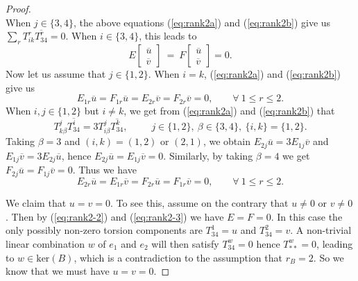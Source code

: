 \documentclass[10pt,a4paper]{amsart}
\begin{document}
\begin{proof}
\begin{equation}
\end{equation}
When $j\in \{ 3,4\}$, the above equations (\ref{eq:rank2a}) and (\ref{eq:rank2b}) give us $\sum_r T^r_{ik} \overline{T^r_{34}} =0$. When $i\in \{ 3,4\}$, this leads to
\begin{equation}  \label{eq:rank2-1}
 E \left[ \begin{array}{c} \overline{u} \\ \overline{v} \end{array} \right] \ = \  F \left[ \begin{array}{c} \overline{u} \\ \overline{v} \end{array} \right]  = 0.
\end{equation}
Now let us assume that $j\in \{ 1,2\}$. When $i=k$, (\ref{eq:rank2a}) and (\ref{eq:rank2b}) give us
\begin{equation}  \label{eq:rank2-2}
 E_{1r} \overline{u} = F_{1r} \overline{u} = E_{2r} \overline{v} = F_{2r} \overline{v} = 0, \ \ \ \ \ \ \ \ \ \forall \ 1\leq r\leq 2.
\end{equation}
When $i,j \in \{ 1,2\}$ but $i\neq k$, we get from (\ref{eq:rank2a}) and (\ref{eq:rank2b}) that
$$  T^j_{k\beta} \overline{T^i_{34}} = 3  T^j_{i\beta} \overline{T^k_{34}}, \ \ \ \ \ \ \ \ \ \ \ j\in \{ 1,2\}, \ \beta \in \{ 3,4\}, \ \{i,k\} =\{ 1,2\}.$$
Taking $\beta=3$ and $(i,k)=(1,2)$ or $(2,1)$, we obtain $E_{2j}\overline{u}= 3E_{1j}\overline{v}$ and $E_{1j}\overline{v}= 3E_{2j}\overline{u}$, hence $E_{2j}\overline{u}= E_{1j}\overline{v}=0$. Similarly, by taking $\beta =4$ we get $F_{2j}\overline{u}= F_{1j}\overline{v}=0$. Thus we have
\begin{equation}  \label{eq:rank2-3}
 E_{2r} \overline{u} = E_{1r} \overline{v}=F_{2r} \overline{u} = F_{1r} \overline{v}=0, \ \ \ \ \ \ \ \ \ \forall \ 1\leq r\leq 2.
\end{equation}

We claim that $u=v=0$. To see this, assume on the contrary that $u\neq 0$ or $v\neq 0$. Then by (\ref{eq:rank2-2}) and (\ref{eq:rank2-3}) we have $E=F=0$. In this case the only possibly non-zero torsion components are $T^1_{34}=u$ and $T^2_{34}=v$. A non-trivial linear combination $w$ of $e_1$ and $e_2$ will then satisfy $T^w_{34}=0$ hence $T^w_{\ast \ast }=0$,  leading to $w\in \mbox{ker}(B)$, which is a contradiction to the assumption that $r_B=2$. So we know that we must have $u=v=0$.


\end{proof}
\end{document}
